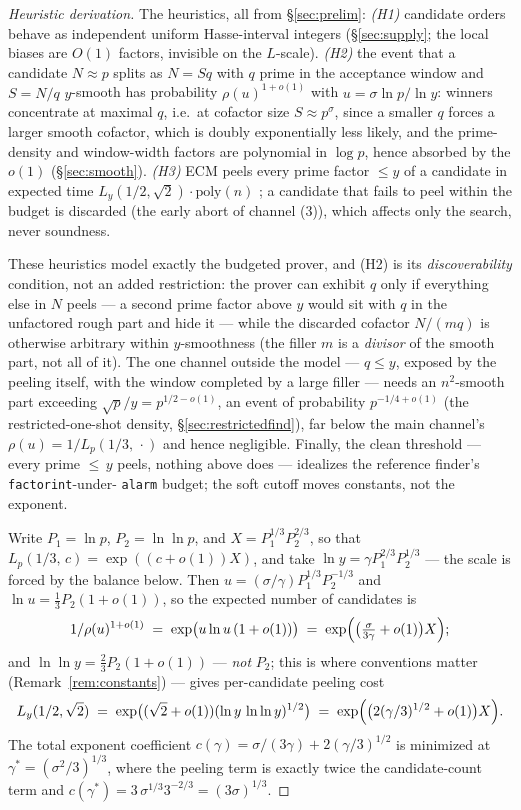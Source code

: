 \documentclass[11pt]{amsart}
\newcommand{\Lp}[2]{L_{p}\!\left(#1,\,#2\right)}
\theoremstyle{plain}
\theoremstyle{definition}
\theoremstyle{remark}
\begin{document}
\begin{proof}[Heuristic derivation]
The heuristics, all from \S\ref{sec:prelim}:
\emph{(H1)} candidate orders behave as independent uniform Hasse-interval integers
(\S\ref{sec:supply}; the local biases are $O(1)$ factors, invisible on the $L$-scale).
\emph{(H2)} the event that a candidate $N \approx p$ splits as $N = Sq$ with $q$ prime in the
acceptance window and $S = N/q$ $y$-smooth has probability $\rho(u)^{1+o(1)}$ with
$u = \sigma\ln p/\ln y$: winners concentrate at maximal $q$, i.e.\ at cofactor size
$S \approx p^{\sigma}$, since a smaller $q$ forces a larger smooth cofactor, which is doubly
exponentially less likely, and the prime-density and window-width factors are polynomial in $\log p$,
hence absorbed by the $o(1)$ (\S\ref{sec:smooth}).
\emph{(H3)} ECM peels every prime factor ${}\le y$ of a candidate in expected time
$L_y(1/2,\sqrt2)\cdot\mathrm{poly}(n)$ \cite{Len87}; a candidate that fails to peel within the budget
is discarded (the early abort of channel (3)), which affects only the search, never soundness.

These heuristics model exactly the budgeted prover, and (H2) is its \emph{discoverability} condition,
not an added restriction: the prover can exhibit $q$ only if everything else in $N$ peels --- a second
prime factor above $y$ would sit with $q$ in the unfactored rough part and hide it --- while the
discarded cofactor $N/(mq)$ is otherwise arbitrary within $y$-smoothness (the filler $m$ is a
\emph{divisor} of the smooth part, not all of it).  The one channel outside the model --- $q \le y$,
exposed by the peeling itself, with the window completed by a large filler --- needs an $n^2$-smooth
part exceeding $\sqrt p/y = p^{1/2 - o(1)}$, an event of probability $p^{-1/4+o(1)}$ (the
restricted-one-shot density, \S\ref{sec:restrictedfind}), far below the main channel's
$\rho(u) = 1/\Lp{1/3}{\cdot}$ and hence negligible.  Finally, the clean threshold --- every prime
${\le}\,y$ peels, nothing above does --- idealizes the reference finder's \texttt{factorint}-under-%
\texttt{alarm} budget; the soft cutoff moves constants, not the exponent.

Write $P_1 = \ln p$, $P_2 = \ln\ln p$, and $X = P_1^{1/3}P_2^{2/3}$, so that
$\Lp{1/3}{c} = \exp((c+o(1))X)$, and take $\ln y = \gamma P_1^{2/3}P_2^{1/3}$ --- the scale is forced
by the balance below.  Then $u = (\sigma/\gamma)P_1^{1/3}P_2^{-1/3}$ and
$\ln u = \tfrac13 P_2(1+o(1))$, so the expected number of candidates is
\[
  1/\rho(u)^{1+o(1)} \;=\; \exp\bigl(u\ln u\,(1+o(1))\bigr)
  \;=\; \exp\Bigl(\bigl(\tfrac{\sigma}{3\gamma}+o(1)\bigr)X\Bigr);
\]
and $\ln\ln y = \tfrac23 P_2(1+o(1))$ --- \emph{not} $P_2$; this is where conventions matter
(Remark~\ref{rem:constants}) --- gives per-candidate peeling cost
\[
  L_y(1/2,\sqrt2) \;=\; \exp\bigl((\sqrt2+o(1))(\ln y\,\ln\ln y)^{1/2}\bigr)
  \;=\; \exp\Bigl(\bigl(2(\gamma/3)^{1/2}+o(1)\bigr)X\Bigr).
\]
The total exponent coefficient $c(\gamma) = \sigma/(3\gamma) + 2(\gamma/3)^{1/2}$ is minimized at
$\gamma^* = (\sigma^2/3)^{1/3}$, where the peeling term is exactly twice the candidate-count term and
$c(\gamma^*) = 3\,\sigma^{1/3}3^{-2/3} = (3\sigma)^{1/3}$.


\end{proof}
\end{document}
